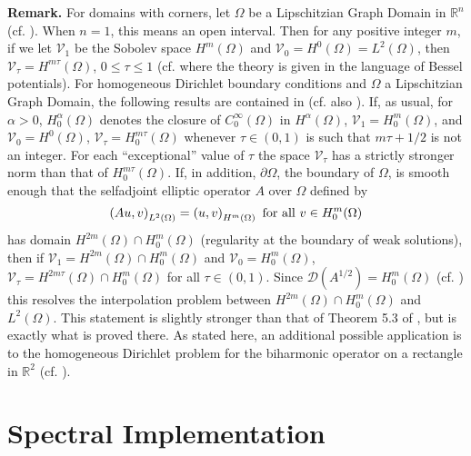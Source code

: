\documentclass[final]{siamltex}
\numberwithin{equation}{section}
\begin{document}
\textbf{Remark.} For domains with corners, let $\Omega$ be a Lipschitzian Graph Domain in ${\mathbb{R}}^n$ (cf. \cite{AAS2}). When $n=1$, this means an open interval. Then for any positive integer $m$, if we let
$\mathcal{V}_1$ be the Sobolev space $H^m(\Omega)$ and $\mathcal{V}_0=H^0(\Omega)=L^2(\Omega)$, then $\mathcal{V}_{\tau}=H^{m \tau} (\Omega)$, $0\le \tau \le 1$ (cf. \cite{AAS2} where the theory is given in the language of Bessel potentials). For homogeneous Dirichlet boundary conditions and $\Omega$ a Lipschitzian Graph Domain, the following results are contained in \cite{Greenlee}
(cf. also \cite{Bramble}). If, as usual, for $\alpha>0$, $H_0^{\alpha}(\Omega)$ denotes the closure of $C_0^{\infty}(\Omega)$ in $H^{\alpha}(\Omega)$,
$\mathcal{V}_{1}=H_0^{m} (\Omega)$, and $\mathcal{V}_{0}=H^{0} (\Omega)$,
$\mathcal{V}_{\tau}=H_0^{m \tau} (\Omega)$ whenever $\tau \in (0,1)$ is such that $m \tau + 1/2$ is not an integer. For each ``exceptional'' value of $\tau$ the space $\mathcal{V}_{\tau}$ has a strictly stronger norm than that of
$H_0^{m \tau} (\Omega)$. If, in addition, $\partial \Omega$, the boundary of $\Omega$, is smooth enough that the selfadjoint elliptic operator $A$ over $\Omega$ defined by
\begin{equation}
\notag
\left(A u, v\right)_{L^2(\Omega)} = \left(u, v \right)_{H^{m}(\Omega)} \text{ for all } v \in H_0^m(\Omega)
\end{equation}
has domain $H^{2m}(\Omega) \cap H_0^m(\Omega)$ (regularity at the boundary of weak solutions), then if $\mathcal{V}_1=H^{2m}(\Omega) \cap H_0^m(\Omega)$ and
$\mathcal{V}_0=H_0^m(\Omega)$, $\mathcal{V}_{\tau}=H^{2 m\tau} (\Omega) \cap H_0^m(\Omega)$ for all $\tau \in (0,1)$. Since $\mathcal{D}(A^{1/2})=H_0^m(\Omega)$ (cf. \cite{Kato}) this resolves the interpolation problem between $H^{2m}(\Omega) \cap H_0^m(\Omega)$ and $L^2(\Omega)$. This statement is slightly stronger than that of Theorem 5.3 of \cite{Greenlee}, but is exactly what is proved there. As stated here, an additional possible application is to the homogeneous Dirichlet problem for the biharmonic operator on a rectangle in ${\mathbb{R}}^2$ (cf. \cite{Grisvard2}).

\section{Spectral Implementation} \label{spectral}
\end{document}
